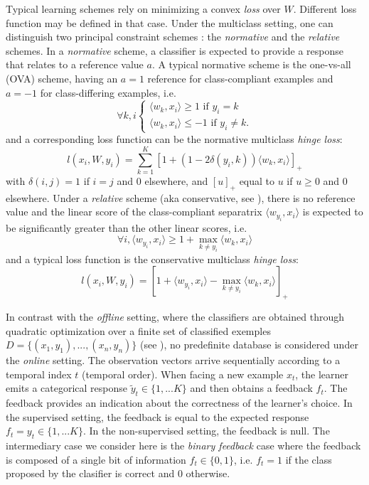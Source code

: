 \documentclass[preprint,12pt,authoryear]{elsarticle}
\begin{document}
Typical learning schemes rely on minimizing a convex \emph{loss} over $W$.  
Different loss function may be defined in that case. 
Under the multiclass setting, one can distinguish two principal constraint schemes : the \emph{normative} and the \emph{relative} schemes. In a \emph{normative} scheme, a classifier is expected to provide a response that relates to a reference value $a$. A typical normative scheme is the one-vs-all (OVA) scheme, having an $a = 1$ reference for class-compliant examples and $a = -1$ for class-differing examples,  i.e. $$\forall k,i \left\{
\begin{array}{l}
\langle w_k, x_i \rangle \geq 1 \text{ if } y_i = k \\
\langle w_k, x_i \rangle \leq -1 \text{ if }y_i \neq k.
\end{array}
\right. 
$$
 and a corresponding loss function can be the normative multiclass \emph{hinge loss}:  
$$ l(x_i,W,y_i) = \sum_{k=1}^K \left[1 + (1 - 2 \delta(y_i,k)) \langle w_k,x_i \rangle\right]_+
$$
with $\delta(i,j) =1$ if $i = j$ and 0 elsewhere, and $[u]_+$ equal to $u$ if $u\geq 0$ and 0 elsewhere.
Under  a \emph{relative} scheme (aka conservative, see \cite{crammer2003ultraconservative}), there is no reference value and the linear score of the class-compliant separatrix $\langle w_{y_i}, x_i\rangle$ is expected to be significantly greater than the other linear scores, i.e.
$$ \forall i, \langle w_{y_i}, x_i \rangle \geq 1 + \max_{k \neq y_i} \langle w_k, x_i \rangle  $$
and a typical loss function is the conservative multiclass \emph{hinge loss}:
	$$ l (x_i,W,y_i) =  \left[ 1 +  \langle w_{y_i}, x_i \rangle - \max_{k \neq y_i} \langle w_k, x_i\rangle\right]_+$$


In contrast with the \textit{offline} setting, where the classifiers are obtained through quadratic optimization over a finite set of classified exemples  $D = \{(x_1, y_1), ..., (x_n, y_n)\}$ (see \cite{vapnik1998statistical}), no predefinite database is considered under the \emph{online} setting. 
The observation vectors arrive sequentially according to a temporal index $t$ (temporal order). When facing a new example $x_t$, the learner emits a categorical response $\tilde{y}_t \in \{1,... K\}$ and then obtains a feedback $f_t$. The feedback provides an indication about the correctness of the learner's choice. In the supervised setting, the feedback is equal to the expected response $f_t = y_t \in \{1,... K\}$. In the non-supervised setting, the feedback is null. The intermediary case we consider here is the \emph{binary feedback} case where the feedback is composed of a single bit of information $f_t \in\{0,1\}$, i.e. $f_t = 1$ if the class proposed by the clasifier is correct and 0 otherwise. 
\end{document}

